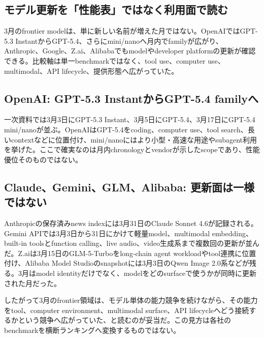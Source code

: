 \begingroup\raggedright
\subsection{モデル更新を「性能表」ではなく利用面で読む}
\par\endgroup

3月のfrontier modelは、単に新しい名前が増えた月ではない。OpenAIではGPT-5.3 InstantからGPT-5.4、さらにmini/nanoへ月内でfamilyが広がり、Anthropic、Google、Z.ai、Alibabaでもmodelやdeveloper platformの更新が確認できる。比較軸は単一benchmarkではなく、tool use、computer use、multimodal、API lifecycle、提供形態へ広がっていた。\autocite{src-46b3e364b737,src-8afdb503cc56,src-9156c37fb1c2,src-a24fd97eb3d0,src-eac8dfbeb78c,src-eea6230f612a,src-f6aa679babd7}


\begingroup\raggedright
\subsection{OpenAI: GPT-5.3 InstantからGPT-5.4 familyへ}
\par\endgroup

一次資料では3月3日にGPT-5.3 Instant、3月5日にGPT-5.4、3月17日にGPT-5.4 mini/nanoが並ぶ。OpenAIはGPT-5.4をcoding、computer use、tool search、長いcontextなどに位置付け、mini/nanoにはより小型・高速な用途やsubagent利用を挙げた。ここで確実なのは月内chronologyとvendorが示したscopeであり、性能優位そのものではない。\autocite{src-46b3e364b737,src-8afdb503cc56,src-eea6230f612a}


\begingroup\raggedright
\subsection{Claude、Gemini、GLM、Alibaba: 更新面は一様ではない}
\par\endgroup

Anthropicの保存済みnews indexには3月31日のClaude Sonnet 4.6が記録される。Gemini APIでは3月3日から31日にかけて軽量model、multimodal embedding、built-in toolsとfunction calling、live audio、video生成系まで複数回の更新が並んだ。Z.aiは3月15日のGLM-5-Turboをlong-chain agent workloadやtool連携に位置付け、Alibaba Model Studioのsnapshotには3月3日のQwen Image 2.0系などが残る。3月はmodel identityだけでなく、modelをどのsurfaceで使うかが同時に更新された月だった。\autocite{src-9156c37fb1c2,src-a24fd97eb3d0,src-eac8dfbeb78c,src-f6aa679babd7}


したがって3月のfrontier領域は、モデル単体の能力競争を続けながら、その能力をtool、computer environment、multimodal surface、API lifecycleへどう接続するかという競争へ広がっていた、と読むのが妥当だ。この見方は各社のbenchmarkを横断ランキングへ変換するものではない。\autocite{src-a24fd97eb3d0,src-eea6230f612a,src-f6aa679babd7}


